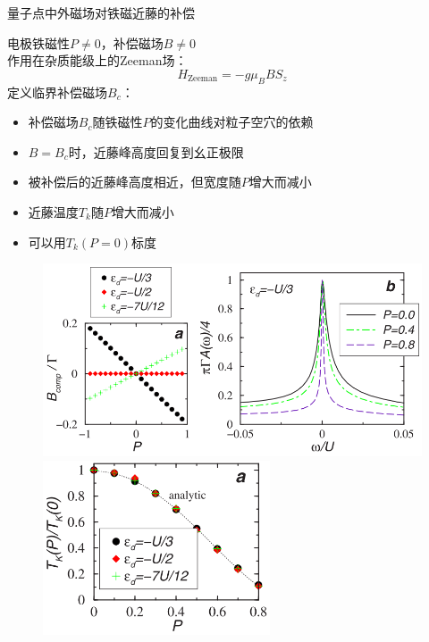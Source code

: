 \documentclass[9pt,t]{beamer} %
\begin{document}
\begin{frame}{量子点中外磁场对铁磁近藤的补偿}
\begin{minipage}[t]{0.55 \textwidth}
电极铁磁性$P\neq 0$，补偿磁场$B\neq 0$\\
作用在杂质能级上的Zeeman场：
\begin{equation}\nonumber
H_{\mathrm{Zeeman}}=-g \mu_{B} B S_{z}
\end{equation}
定义临界补偿磁场$B_{c}$：\\
\vspace{-0.5cm}
\begin{itemize}
\item 补偿磁场$B_{c}$随铁磁性$P$的变化曲线对粒子空穴的依赖
\item $B=B_{c}$时，近藤峰高度回复到幺正极限
\item 被补偿后的近藤峰高度相近，但宽度随$P$增大而减小
\item 近藤温度$T_{k}$随$P$增大而减小
\item 可以用$T_{k}(P=0)$标度
\end{itemize}
\end{minipage}%
\begin{minipage}[t]{0.45 \textwidth}
\begin{figure}
\includegraphics[width=\textwidth]{Aw-P-Bc.png}
\includegraphics[width=0.6\textwidth]{Tk-P.png}
\end{figure}
\end{minipage}
\vspace{0.4cm}
\end{frame}
\end{document}
